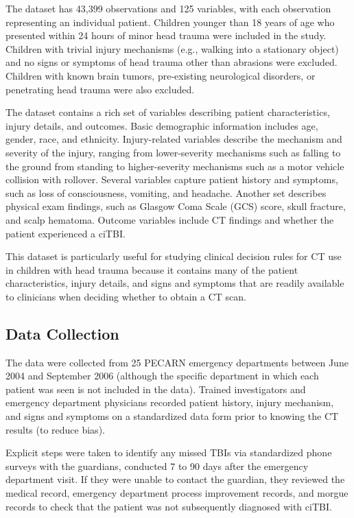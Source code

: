 \documentclass[11pt,letterpaper]{article}
\begin{document}
The dataset has 43,399 observations and 125 variables, with each observation representing an individual patient.
Children younger than 18 years of age who presented within 24 hours of minor head trauma were included in the study.
Children with trivial injury mechanisms (e.g., walking into a stationary object) and no signs or symptoms of head trauma other than abrasions
were excluded. Children with known brain tumors, pre-existing neurological disorders, or penetrating head trauma were
also excluded. 

The dataset contains a rich set of variables describing patient characteristics, injury details, and outcomes.
Basic demographic information includes age, gender, race, and ethnicity. 
Injury-related variables describe the mechanism and severity of the injury, ranging from lower-severity
mechanisms such as falling to the ground from standing to higher-severity mechanisms 
such as a motor vehicle collision with rollover. Several variables capture patient history and symptoms,
such as loss of consciousness, vomiting, and headache. Another set describes physical exam findings, such
as Glasgow Coma Scale (GCS) score, skull fracture, and scalp hematoma. 
Outcome variables include CT findings and whether the patient experienced a ciTBI. 

This dataset is particularly useful for studying clinical decision rules for CT use in children with head trauma 
because it contains many of the patient characteristics, injury details, and signs and symptoms that are
readily available to clinicians when deciding whether to obtain a CT scan.

\subsection{Data Collection}\label{data-collection}

The data were collected from 25 PECARN emergency departments between June 2004 and September 2006
(although the specific department in which each patient was seen is not included in the data).
Trained investigators and emergency department physicians recorded patient history, injury mechanism, and signs and symptoms
on a standardized data form prior to knowing the CT results (to reduce bias).  

Explicit steps were taken to identify any missed TBIs via standardized phone surveys with the guardians, conducted 
7 to 90 days after the emergency department visit. If they were unable to contact the guardian, they 
reviewed the medical record, emergency department process improvement records, and morgue records to check
that the patient was not subsequently diagnosed with ciTBI. 
\end{document}
